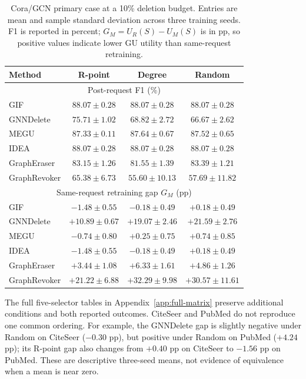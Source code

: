 \begin{table}[t]
\centering
\small
\caption{Cora/GCN primary case at a 10\% deletion budget. Entries are mean and sample standard deviation across three training seeds. F1 is reported in percent; $G_M=U_R(S)-U_M(S)$ is in pp, so positive values indicate lower GU utility than same-request retraining.}
\label{tab:cora-main}
\begin{tabular}{lccc}
\toprule
Method & R-point & Degree & Random \\
\midrule
\multicolumn{4}{c}{Post-request F1 (\%)} \\
\midrule
GIF & $88.07\pm0.28$ & $88.07\pm0.28$ & $88.07\pm0.28$ \\
GNNDelete & $75.71\pm1.02$ & $68.82\pm2.72$ & $66.67\pm2.62$ \\
MEGU & $87.33\pm0.11$ & $87.64\pm0.67$ & $87.52\pm0.65$ \\
IDEA & $88.07\pm0.28$ & $88.07\pm0.28$ & $88.07\pm0.28$ \\
GraphEraser & $83.15\pm1.26$ & $81.55\pm1.39$ & $83.39\pm1.21$ \\
GraphRevoker & $65.38\pm6.73$ & $55.60\pm10.13$ & $57.69\pm11.82$ \\
\midrule
\multicolumn{4}{c}{Same-request retraining gap $G_M$ (pp)} \\
\midrule
GIF & $-1.48\pm0.55$ & $-0.18\pm0.49$ & $+0.18\pm0.49$ \\
GNNDelete & $+10.89\pm0.67$ & $+19.07\pm2.46$ & $+21.59\pm2.76$ \\
MEGU & $-0.74\pm0.80$ & $+0.25\pm0.75$ & $+0.74\pm0.85$ \\
IDEA & $-1.48\pm0.55$ & $-0.18\pm0.49$ & $+0.18\pm0.49$ \\
GraphEraser & $+3.44\pm1.08$ & $+6.33\pm1.61$ & $+4.86\pm1.26$ \\
GraphRevoker & $+21.22\pm6.88$ & $+32.29\pm9.98$ & $+30.57\pm11.61$ \\
\bottomrule
\end{tabular}
\end{table}

The full five-selector tables in Appendix~\ref{app:full-matrix} preserve additional conditions and both reported outcomes. CiteSeer and PubMed do not reproduce one common ordering. For example, the GNNDelete gap is slightly negative under Random on CiteSeer ($-0.30$ pp), but positive under Random on PubMed ($+4.24$ pp); its R-point gap also changes from $+0.40$ pp on CiteSeer to $-1.56$ pp on PubMed. These are descriptive three-seed means, not evidence of equivalence when a mean is near zero.

